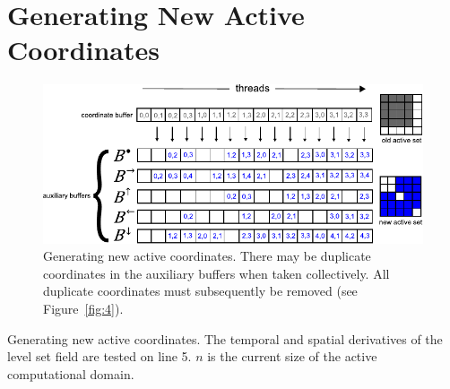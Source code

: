 \section{Generating New Active Coordinates}
\label{subsec:generatingNewActiveCoordinates}


\begin{figure}[t]
\centering
\includegraphics[width=6.0in]{figures/NewActive.pdf}
\caption{Generating new active coordinates. There may be duplicate coordinates in the auxiliary buffers when taken collectively. All duplicate coordinates must subsequently be removed (see Figure~\ref{fig:4}).}
\label{fig:3}
\end{figure}


\begin{Listing}[t]
    \caption{Generating new active coordinates. The temporal and spatial derivatives of the level set field are tested on line 5. $n$ is the current size of the active computational domain. \label{pseudo:4} }
    \begin{algorithmic}[1]
                \ENDIF
            \ENDFOR
            \ENDIF                    
        \ENDFOR
    \end{algorithmic}
\end{Listing}


